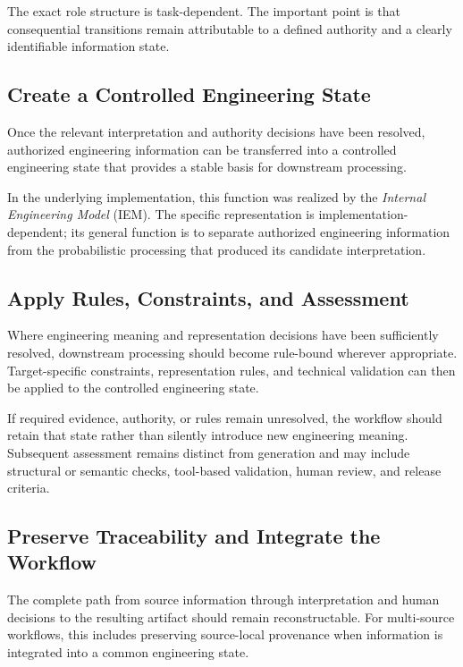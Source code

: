 The exact role structure is task-dependent. The important point is that consequential
transitions remain attributable to a defined authority and a clearly identifiable
information state.

\subsection{Create a Controlled Engineering State}
\label{sec:path_controlled_state}

Once the relevant interpretation and authority decisions have been resolved, authorized
engineering information can be transferred into a controlled engineering state that
provides a stable basis for downstream processing.

In the underlying implementation, this function was realized by the \emph{Internal
Engineering Model} (IEM). The specific representation is implementation-dependent; its
general function is to separate authorized engineering information from the probabilistic
processing that produced its candidate interpretation.

\subsection{Apply Rules, Constraints, and Assessment}
\label{sec:path_rules}

Where engineering meaning and representation decisions have been sufficiently resolved,
downstream processing should become rule-bound wherever appropriate. Target-specific
constraints, representation rules, and technical validation can then be applied to the
controlled engineering state.

If required evidence, authority, or rules remain unresolved, the workflow should retain
that state rather than silently introduce new engineering meaning. Subsequent assessment
remains distinct from generation and may include structural or semantic checks, tool-based
validation, human review, and release criteria.

\subsection{Preserve Traceability and Integrate the Workflow}
\label{sec:path_integration}

The complete path from source information through interpretation and human decisions to the
resulting artifact should remain reconstructable. For multi-source workflows, this includes
preserving source-local provenance when information is integrated into a common engineering
state.

